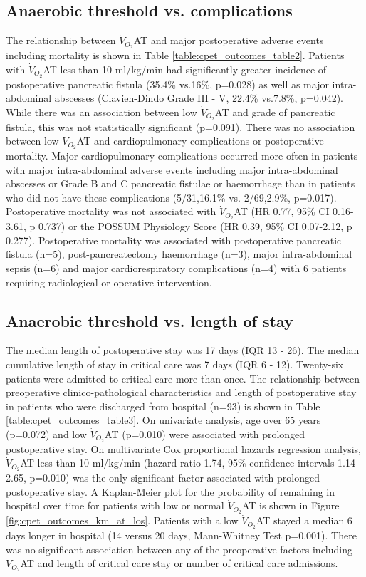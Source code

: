 \subsection{Anaerobic threshold vs. complications}
The relationship between $\dot{V}_{O_2}$AT and major postoperative adverse events including mortality is shown in Table \ref{table:cpet_outcomes_table2}. 
Patients with $\dot{V}_{O_2}$AT less than 10 ml/kg/min had significantly greater incidence of postoperative pancreatic fistula (35.4\% vs.16\%, p=0.028) as well as major intra-abdominal abscesses (Clavien-Dindo Grade III - V, 22.4\% vs.7.8\%, p=0.042). 
While there was an association between low $\dot{V}_{O_2}$AT and grade of pancreatic fistula, this was not statistically significant (p=0.091). 
There was no association between low $\dot{V}_{O_2}$AT and cardiopulmonary complications or postoperative mortality. 
Major cardiopulmonary complications occurred more often in patients with major intra-abdominal adverse events including major intra-abdominal abscesses or Grade B and C pancreatic fistulae or haemorrhage than in patients who did not have these complications (5/31,16.1\% vs. 2/69,2.9\%, p=0.017). 
Postoperative mortality was not associated with $\dot{V}_{O_2}$AT (HR 0.77, 95\% CI 0.16-3.61, p 0.737) or the POSSUM Physiology Score (HR 0.39, 95\% CI 0.07-2.12, p 0.277). 
Postoperative mortality was associated with postoperative pancreatic fistula (n=5), post-pancreatectomy haemorrhage (n=3), major intra-abdominal sepsis (n=6) and major cardiorespiratory complications (n=4) with 6 patients requiring radiological or operative intervention.



\subsection{Anaerobic threshold vs. length of stay}
The median length of postoperative stay was 17 days (IQR 13 - 26). 
The median cumulative length of stay in critical care was 7 days (IQR 6 - 12). 
Twenty-six patients were admitted to critical care more than once. 
The relationship between preoperative clinico-pathological characteristics and length of postoperative stay in patients who were discharged from hospital (n=93) is shown in Table \ref{table:cpet_outcomes_table3}. 
On univariate analysis, age over 65 years (p=0.072) and low $\dot{V}_{O_2}$AT (p=0.010) were associated with prolonged postoperative stay. 
On multivariate Cox proportional hazards regression analysis, $\dot{V}_{O_2}$AT less than 10 ml/kg/min (hazard ratio 1.74, 95\% confidence intervals 1.14-2.65, p=0.010) was the only significant factor associated with prolonged postoperative stay. 
A Kaplan-Meier plot for the probability of remaining in hospital over time for patients with low or normal $\dot{V}_{O_2}$AT is shown in Figure \ref{fig:cpet_outcomes_km_at_los}. 
Patients with a low $\dot{V}_{O_2}$AT stayed a median 6 days longer in hospital (14 versus 20 days, Mann-Whitney Test p=0.001). 
There was no significant association between any of the preoperative factors including $\dot{V}_{O_2}$AT and length of critical care stay or number of critical care admissions.

